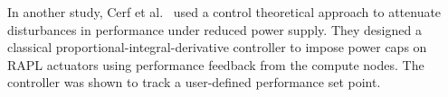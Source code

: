 





In another study, Cerf et al.~\cite{cerf2021sustaining} used a control theoretical approach  to attenuate disturbances in performance under reduced power supply. They designed a classical proportional-integral-derivative controller to impose power caps on RAPL actuators using performance feedback from the compute nodes. The controller was shown to track a user-defined performance set point.

